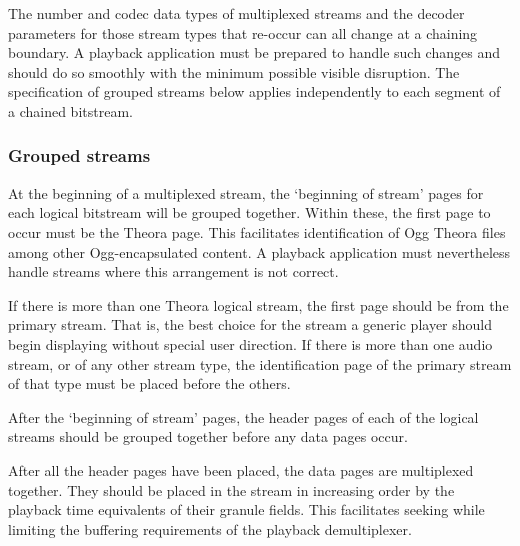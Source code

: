 \documentclass[11pt,letterpaper]{article}
\begin{document}
The number and codec data types of multiplexed streams and the decoder
 parameters for those stream types that re-occur can all change at a
 chaining boundary.
A playback application must be prepared to handle such changes and
 should do so smoothly with the minimum possible visible disruption.
The specification of grouped streams below applies independently to each
 segment of a chained bitstream.

\subsubsection{Grouped streams}

At the beginning of a multiplexed stream, the `beginning of stream'
 pages for each logical bitstream will be grouped together.
Within these, the first page to occur must be the Theora page.
This facilitates identification of Ogg Theora files among other
 Ogg-encapsulated content.
A playback application must nevertheless handle streams where this
 arrangement is not correct.

If there is more than one Theora logical stream, the first page should
 be from the primary stream.
That is, the best choice for the stream a generic player should begin
 displaying without special user direction.
If there is more than one audio stream, or of any other stream
 type, the identification page of the primary stream of that type
 must be placed before the others.

After the `beginning of stream' pages, the header pages of each of
 the logical streams should be grouped together before any data pages
 occur.

After all the header pages have been placed,
 the data pages are multiplexed together.
They should be placed in the stream in increasing order by the playback
 time equivalents of their granule fields.
This facilitates seeking while limiting the buffering requirements of the
 playback demultiplexer.


\end{document}
